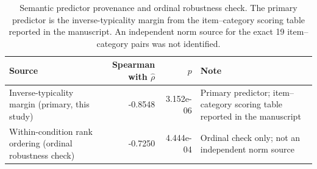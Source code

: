 \begin{table}[htbp]
\centering
\small
\caption{Semantic predictor provenance and ordinal robustness check. The primary predictor is the inverse-typicality margin from the item--category scoring table reported in the manuscript. An independent norm source for the exact 19 item--category pairs was not identified.}
\label{tab:semantic-provenance}
\begin{tabular}{lrrl}
\toprule
Source & Spearman with $\hat{\rho}$ & $p$ & Note \\
\midrule
Inverse-typicality margin (primary, this study) & -0.8548 & 3.152e-06 & Primary predictor; item--category scoring table reported in the manuscript \\
Within-condition rank ordering (ordinal robustness check) & -0.7250 & 4.444e-04 & Ordinal check only; not an independent norm source \\
\bottomrule
\end{tabular}
\end{table}
